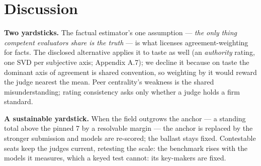 \documentclass{article}
\begin{document}
\section{Discussion}\label{discussion}

\textbf{Two yardsticks.} The factual estimator's one assumption --- \emph{the only thing competent evaluators share is the truth} --- is what licenses agreement-weighting for facts. The disclosed alternative applies it to taste as well (an \emph{authority} rating, one SVD per subjective axis; Appendix A.7); we decline it because on taste the dominant axis of agreement is shared convention, so weighting by it would reward the judge nearest the mean. Peer centrality's weakness is the shared misunderstanding; rating consistency asks only whether a judge holds a firm standard.

\textbf{A sustainable yardstick.} When the field outgrows the anchor --- a standing total above the pinned 7 by a resolvable margin --- the anchor is replaced by the stronger submission and models are re-scored; the ballast stays fixed. Contestable seats keep the judges current, retesting the scale: the benchmark rises with the models it measures, which a keyed test cannot: its key-makers are fixed.
\end{document}
